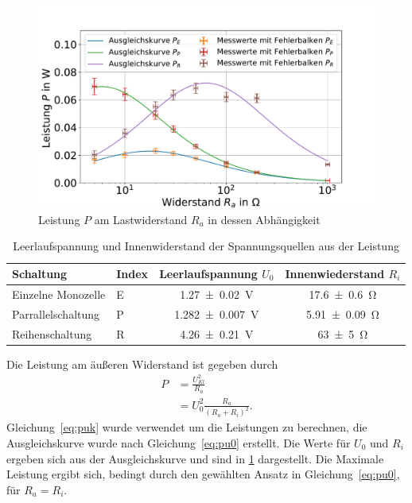 \FloatBarrier

\begin{figure}[h]
	\centering
	\includegraphics[width=0.9\linewidth]{"auswertung/Auswertung Innenwiderstand/Batterie Gesamt P"}
	\caption{Leistung $P$ am Lastwiderstand $R_a$ in dessen Abhängigkeit}
	\label{fig:batt-ges-p}
\end{figure}



\begin{table}
	\caption{Leerlaufspannung und Innenwiderstand der Spannungsquellen aus der Leistung}
	\centering
	\begin{tabular}{|l l||c|c|}
		\hline 
		Schaltung & Index	& Leerlaufspannung $U_0$ & Innenwiederstand $R_i$ \\ 
		\hline \hline
		Einzelne Monozelle	&E& \SI{1.27+-0.02}{V}  & \SI{17.6+-0.6}{\ohm } \\ 
		\hline  
		Parrallelschaltung	&P& \SI{1.282+-0.007}{V } &\SI{5.91+-0.09}{\ohm }  \\ 
		\hline   
		Reihenschaltung	&R& \SI{4.26+-0.21}{V } &\SI{63+-5}{\ohm }  \\ 
		\hline 
	\end{tabular} 
	
	\label{tab:batt-U-P}
	
\end{table}


Die Leistung am äußeren Widerstand ist gegeben durch 
\begin{align}
 P &=\frac{U_{Kl}^2}{R_a} \label{eq:puk}\\
 &= U_0^2 \frac{R_a}{(R_a+R_i)^2} \label{eq:pu0}.
\end{align} 
Gleichung~\ref{eq:puk} wurde verwendet um die Leistungen zu berechnen, die Ausgleichskurve wurde nach Gleichung~\ref{eq:pu0} erstellt.
Die Werte für $U_0$ und $R_i$ ergeben sich aus der Ausgleichskurve und sind in \cref{tab:batt-U-P} dargestellt. Die Maximale Leistung ergibt sich, bedingt durch den gewählten Ansatz in Gleichung~\ref{eq:pu0}, für $R_a=R_i$. 






